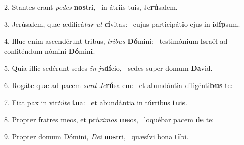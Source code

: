2. Stantes erant \textit{pe}\textit{des} \textbf{nos}tri, \ast\  in átriis tuis, Je\textbf{rú}salem.\

3. Jerúsalem, quæ ædificá\textit{tur} \textit{ut} \textbf{cí}vitas: \ast\  cujus participátio ejus in id\textbf{íp}sum.\

4. Illuc enim ascendérunt tribus, \textit{tri}\textit{bus} \textbf{Dó}mini: \ast\  testimónium Israël ad confiténdum nómini \textbf{Dó}mini.\

5. Quia illic sedérunt sedes \textit{in} \textit{ju}\textbf{dí}cio, \ast\  sedes super domum \textbf{Da}vid.\

6. Rogáte quæ ad pacem \textit{sunt} \textit{Je}\textbf{rú}salem: \ast\  et abundántia diligénti\textbf{bus} te:\

7. Fiat pax in vir\textit{tú}\textit{te} \textbf{tu}a: \ast\  et abundántia in túrribus \textbf{tu}is.\

8. Propter fratres meos, et pró\textit{xi}\textit{mos} \textbf{me}os, \ast\  loquébar pacem \textbf{de} te:\

9. Propter domum Dómini, \textit{De}\textit{i} \textbf{nos}tri, \ast\  quæsívi bona \textbf{ti}bi.\

